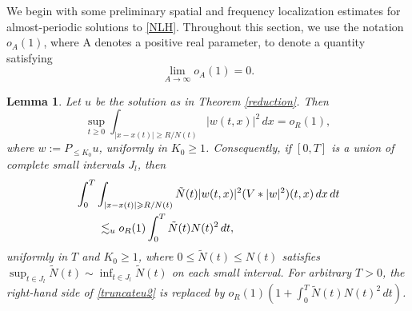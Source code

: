 \documentclass[reqno,11pt]{amsart}
\theoremstyle{plain}
\newtheorem{lemma}[theorem]{Lemma}
\theoremstyle{definition}
\numberwithin{equation}{section}
\numberwithin{theorem}{section}
\def\geq{\geqslant}
\def\leq{\leqslant}
\begin{document}
We begin with some preliminary spatial and frequency localization estimates for almost-periodic solutions to \eqref{NLH}. Throughout this section, we use the notation
$o_A(1)$, where A denotes a positive real parameter, to denote a quantity satisfying
\[
\lim_{A\to\infty}o_A(1)=0.
\]
\begin{lemma}\label{quasisolitonlemma1}
Let $u$ be the solution as in Theorem \ref{reduction}. Then
\begin{equation}\label{truncateu}
 \sup_{t\geq0}\int_{|x-x(t)|\geq R/N(t)}|w(t,x)|^2\,dx=o_R(1),
\end{equation}
where $w:=P_{\leq K_0}u$, uniformly in $K_0\geq1$. Consequently, if
$[0,T]$ is a union of complete small intervals $J_l$, then
\begin{align}\label{truncateu2}
 &\int_0^T\int_{|x-x(t)|\geq R/N(t)}
       \tilde N(t)|w(t,x)|^2(V*|w|^2)(t,x)\,dx\,dt\notag\\
 &\qquad\lesssim_u o_R(1)\int_0^T\tilde N(t)N(t)^2\,dt,
\end{align}
uniformly in $T$ and $K_0\geq1$, where $0\leq\tilde N(t)\leq N(t)$
satisfies $\sup_{t\in J_l}\tilde N(t)\sim\inf_{t\in J_l}\tilde N(t)$ on
each small interval. For arbitrary $T>0$, the right-hand side of
\eqref{truncateu2} is replaced by $o_R(1)(1+\int_0^T\tilde N(t)N(t)^2\,dt)$.
\end{lemma}
\end{document}
